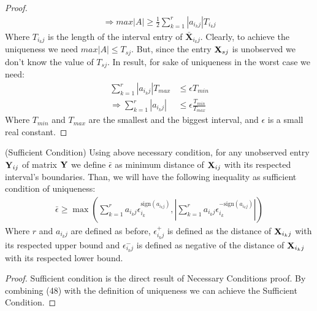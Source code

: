 \documentclass{article}
\begin{document}
\begin{thm:thm}
\begin{proof}
\begin{align}
\Rightarrow max|A| \geqslant \frac{1}{2}\sum_{k=1}^{r}|a_{i_kj}|T_{i_kj}
\end{align}
 Where $T_{i_kj}$ is the length of the interval entry of $\mathbf{\bar X}_{i_kj}$. Clearly, to achieve the uniqueness we need $max|A|\leq T_{sj}$. But, since the entry $\mathbf{X}_{sj}$ is unobserved we don't know the value of $T_{sj}$. In result, for sake of uniqueness in the worst case we need:
\begin{align}
\sum_{k=1}^{r}|a_{i_kj}|T_{max} &\leq \epsilon T_{min}\\
\Rightarrow\sum_{k=1}^{r}|a_{i_kj}| &\leq\epsilon \frac{T_{min}}{T_{max}}
\end{align} 
Where $T_{min}$ and $T_{max}$ are the smallest and the biggest interval, and $\epsilon$ is a small real constant. 
 \end{proof}
\end{thm:thm}


\begin{thm:thm} (Sufficient Condition)
Using above necessary condition, for any unobserved entry $\mathbf{Y}_{ij}$ of matrix $\mathbf{Y}$ we define $\bar\epsilon$ as minimum distance of $\mathbf{X}_{ij}$ with its respected interval's boundaries. Than, we will have the following inequality as sufficient condition of uniqueness:
\begin{align}
\bar\epsilon \geq \max (\sum_{k=1}^{r}a_{i_kj}\epsilon_{i_k}^{\text{sign}(a_{i_kj})} , \left | \sum_{k=1}^{r}a_{i_kj}\epsilon_{i_k}^{-\text{sign}(a_{i_kj})}  \right |)
\end{align}
Where $r$ and $a_{i_kj}$ are defined as before, $\epsilon_{i_kj}^{+}$ is defined as the distance of $\mathbf{X}_{i_kj}$ with its respected upper bound and $\epsilon_{i_kj}^{-}$ is defined as negative of the distance of $\mathbf{X}_{i_kj}$ with its respected lower bound.
\begin{proof}
Sufficient condition is the direct result of Necessary Conditions proof. By combining (48) with the definition of uniqueness we can achieve the Sufficient Condition.
\end{proof}
\end{thm:thm}
\end{document}
